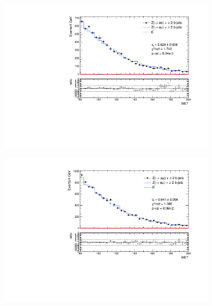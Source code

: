 \documentclass{article}
\begin{document}
\begin{figure}
\begin{center}
\begin{subfigure}[b]{0.45\textwidth}
	\end{subfigure}
\end{center}
\end{figure}

\newpage

\begin{figure}
\caption{MET analysis with 4 GeV bins}
\begin{center}
	\begin{subfigure}[b]{0.45\textwidth}
		\includegraphics[width=\linewidth]{Zee_MET_2016.pdf}
	\end{subfigure}
	\begin{subfigure}[b]{0.45\textwidth}
		\includegraphics[width=\linewidth]{Zmm_MET_2016.pdf}
	\end{subfigure}
	\begin{subfigure}[b]{0.45\textwidth}

\end{subfigure}
\end{center}
\end{figure}
\end{document}
